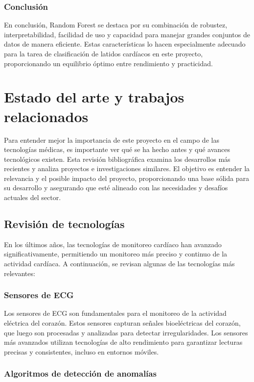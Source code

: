 \subsubsection{Conclusión}

En conclusión, Random Forest se destaca por su combinación de robustez, interpretabilidad, facilidad de uso y capacidad para manejar grandes conjuntos de datos de manera eficiente. Estas características lo hacen especialmente adecuado para la tarea de clasificación de latidos cardíacos en este proyecto, proporcionando un equilibrio óptimo entre rendimiento y practicidad.

\section{Estado del arte y trabajos relacionados}

Para entender mejor la importancia de este proyecto en el campo de las tecnologías médicas, es importante ver qué se ha hecho antes y qué avances tecnológicos existen. Esta revisión bibliográfica examina los desarrollos más recientes y analiza proyectos e investigaciones similares. El objetivo es entender la relevancia y el posible impacto del proyecto, proporcionando una base sólida para su desarrollo y asegurando que esté alineado con las necesidades y desafíos actuales del sector.


\subsection{Revisión de tecnologías}

En los últimos años, las tecnologías de monitoreo cardíaco han avanzado significativamente, permitiendo un monitoreo más preciso y continuo de la actividad cardíaca. A continuación, se revisan algunas de las tecnologías más relevantes:

\subsubsection{Sensores de ECG}

Los sensores de ECG son fundamentales para el monitoreo de la actividad eléctrica del corazón. Estos sensores capturan señales bioeléctricas del corazón, que luego son procesadas y analizadas para detectar irregularidades. Los sensores más avanzados utilizan tecnologías de alto rendimiento para garantizar lecturas precisas y consistentes, incluso en entornos móviles.

\subsubsection{Algoritmos de detección de anomalías}

